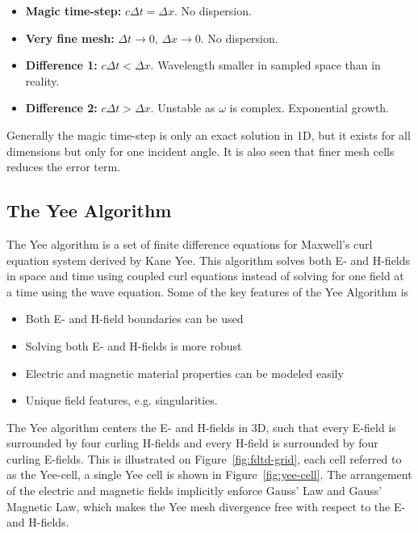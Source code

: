 \begin{itemize}
\item \textbf{Magic time-step:} $c\Delta t = \Delta x$. No dispersion.
\item \textbf{Very fine mesh:} $\Delta t \rightarrow 0$, $\Delta x \rightarrow 0$. No dispersion.
\item \textbf{Difference 1:} $c\Delta t < \Delta x$. Wavelength smaller in sampled space than in reality.
\item \textbf{Difference 2:} $c\Delta t > \Delta x$. Unstable as $\omega$ is complex. Exponential growth.
\end{itemize}

Generally the magic time-step is only an exact solution in 1D, but it exists for all dimensions but only for one incident angle\cite{taflove2000computional}. It is also seen that finer mesh cells reduces the error term.  

\subsection{The Yee Algorithm}
The Yee algorithm is a set of finite difference equations for Maxwell's curl equation system derived by Kane Yee. This algorithm solves both E- and H-fields in space and time using coupled curl equations instead of solving for one field at a time using the wave equation. Some of the key features of the Yee Algorithm is\cite{taflove2000computional}

\begin{itemize}
\item Both E- and H-field boundaries can be used
\item Solving both E- and H-fields is more robust 
\item Electric and magnetic material properties can be modeled easily
\item Unique field features, e.g. singularities. 
\end{itemize}
The Yee algorithm centers the E- and H-fields in 3D, such that every E-field is surrounded by four curling H-fields and every H-field is surrounded by four curling E-fields. This is illustrated on Figure~\ref{fig:fdtd-grid}, each cell referred to as the Yee-cell, a single Yee cell is shown in Figure~\ref{fig:yee-cell}. The arrangement of the electric and magnetic fields implicitly enforce Gauss' Law and Gauss' Magnetic Law, which makes the Yee mesh divergence free with respect to the E- and H-fields\cite{taflove2000computional}.  


